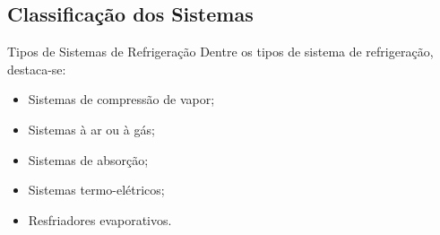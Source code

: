\subsection{Classificação dos Sistemas}

    \begin{frame}{Tipos de Sistemas de Refrigeração}\vspace*{-0em}
        Dentre os tipos de sistema de refrigeração, destaca-se: \\[\medskipamount]
        \begin{itemize}
            \item<1-> Sistemas de \alert{compressão de vapor};
            \item<2-> Sistemas à \alert{ar ou à gás};
            \item<3-> Sistemas de \alert{absorção};
            \item<4-> Sistemas \alert{termo-elétricos};
            \item<5-> Resfriadores \alert{evaporativos}.
        \end{itemize}
    \end{frame}

